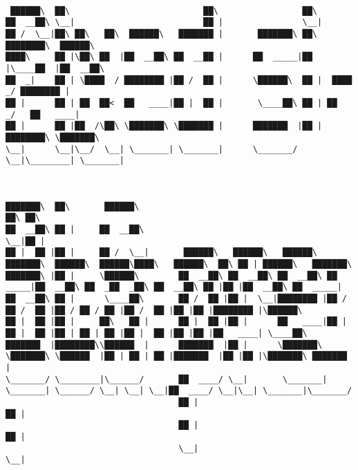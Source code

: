 \documentclass[varwidth=\maxdimen,margin=0.5cm,multi={verbatim}]{standalone}
\begin{document}
\begin{verbatim}

 ██████\  ██\                           ██\                 ██\
██  __██\ \__|                          ██ |                \__|
██ /  \__|██\ ██\   ██\  ██████\   ███████ |       ███████\ ██\ ████████\  ██████\
████\     ██ |\██\ ██  |██  __██\ ██  __██ |      ██  _____|██ |\____██  |██  __██\
██  _|    ██ | \████  / ████████ |██ /  ██ |      \██████\  ██ |  ████ _/ ████████ |
██ |      ██ | ██  ██<  ██   ____|██ |  ██ |       \____██\ ██ | ██  _/   ██   ____|
██ |      ██ |██  /\██\ \███████\ \███████ |      ███████  |██ |████████\ \███████\
\__|      \__|\__/  \__| \_______| \_______|      \_______/ \__|\________| \_______|



███████\  ██\       ██████\                                                                                  ██\ ██\
██  __██\ ██ |     ██  __██\                                                                                 \__|██ |
██ |  ██ |██ |     ██ /  \__|       ██████\   ██████\   ██████\   ███████\  ██████\  ██████\████\   ██████\  ██\ ██ | ██████\   ███████\
███████\ |██ |     \██████\        ██  __██\ ██  __██\ ██  __██\ ██  _____|██  __██\ ██  _██  _██\ ██  __██\ ██ |██ |██  __██\ ██  _____|
██  __██\ ██ |      \____██\       ██ /  ██ |██ |  \__|████████ |██ /      ██ /  ██ |██ / ██ / ██ |██ /  ██ |██ |██ |████████ |\██████\
██ |  ██ |██ |     ██\   ██ |      ██ |  ██ |██ |      ██   ____|██ |      ██ |  ██ |██ | ██ | ██ |██ |  ██ |██ |██ |██   ____| \____██\
███████  |████████\\██████  |      ███████  |██ |      \███████\ \███████\ \██████  |██ | ██ | ██ |███████  |██ |██ |\███████\ ███████  |
\_______/ \________|\______/       ██  ____/ \__|       \_______| \_______| \______/ \__| \__| \__|██  ____/ \__|\__| \_______|\_______/
                                   ██ |                                                            ██ |
                                   ██ |                                                            ██ |
                                   \__|                                                            \__|




\end{verbatim}
\end{document}
